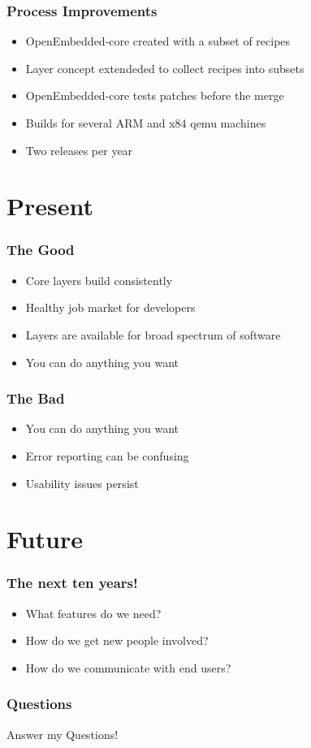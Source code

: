 \documentclass{beamer}
\begin{document}
\begin{frame}
\frametitle{Process Improvements}

\begin{itemize}
	\item OpenEmbedded-core created with a subset of recipes
	\item Layer concept extendeded to collect recipes into subsets
	\item OpenEmbedded-core tests patches before the merge
	\item Builds for several ARM and x84 qemu machines
	\item Two releases per year
\end{itemize}

\end{frame}


\section{Present}

\begin{frame}
\frametitle{The Good}

\begin{itemize}
\item Core layers build consistently
\item Healthy job market for developers
\item Layers are available for broad spectrum of software
\item You can do anything you want
\end{itemize}

\end{frame}

\begin{frame}
\frametitle{The Bad}

\begin{itemize}
\item You can do anything you want
\item Error reporting can be confusing
\item Usability issues persist
\end{itemize}

\end{frame}

\section{Future}

\begin{frame}
\frametitle{The next ten years!}

\begin{itemize}
\item What features do we need?
\item How do we get new people involved?
\item How do we communicate with end users?
\end{itemize}

\end{frame}

\begin{frame}
\frametitle{Questions}

Answer my Questions!

\end{frame}
\end{document}
